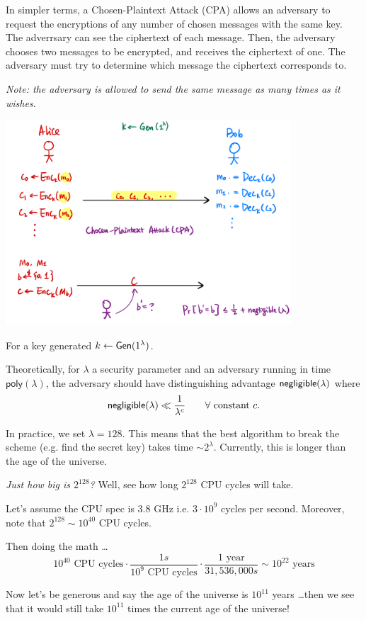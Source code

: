 \begin{definition}
    In simpler terms, a Chosen-Plaintext Attack (CPA) allows an adversary to request the encryptions of any number of chosen messages with the same key. The adverrsary can see the ciphertext of each message. Then, the adversary chooses two messages to be encrypted, and receives the ciphertext of one. The adversary must try to determine which message the ciphertext corresponds to.

    \emph{Note: the adversary is allowed to send the same message as many times as it wishes}.
\end{definition}

\begin{center}
    \includegraphics[width=0.8\textwidth]{images/2023-01-31/computational-security.png}
\end{center}

For a key generated $k\leftarrow \operatorname{\mathsf{Gen}}(1^\lambda)$.

Theoretically, for $\lambda$ a security parameter and an adversary running in time $\mathsf{poly}(\lambda)$, the adversary should have distinguishing advantage $\operatorname{\mathsf{negligible}}(\lambda)$ where
\[\operatorname{\mathsf{negligible}}(\lambda) \ll \frac{1}{\lambda^c}\qquad \forall\text{ constant }c.\]

In practice, we set $\lambda = 128$. This means that the best algorithm to break the scheme (e.g. find the secret key) takes time $\sim 2^\lambda$. Currently, this is longer than the age of the universe.

\begin{remark}
    \emph{Just how big is $2^{128}$?} Well, see how long $2^{128}$ CPU cycles will take.

    Let's assume the CPU spec is 3.8 GHz i.e. $3 \cdot 10^9$ cycles per second. Moreover, note that $2^{128} \sim 10^{40}$ CPU cycles.
    
    Then doing the math \dots 
    $$10^{40} \text{ CPU cycles} \cdot \frac{1s}{10^9 \text{ CPU cycles}} \cdot \frac{1 \text{ year}}{31,536,000s} \sim 10^{22} \text{ years}$$

    Now let's be generous and say the age of the universe is $10^{11}$ years \dots then we see that it would still take $10^{11}$ times the current age of the universe!
\end{remark}

